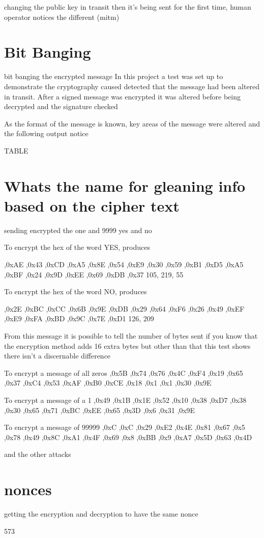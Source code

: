 changing the public key in transit then it's being sent for the first time, human operator notices the different (mitm)

\section{Bit Banging}

bit banging the encrypted message
In this project a test was set up to demonstrate the cryptography caused detected that the message had been altered in transit.
After a signed message was encrypted it was altered before being decrypted and the signature checked

As the format of the message is known, key areas of the message were altered and the following output notice

TABLE


\section{Whats the name for gleaning info based on the cipher text}

sending encrypted the one and 9999
yes and no

To encrypt the hex of the word YES, produces 

,0xAE ,0x43 ,0xCD ,0xA5 ,0x8E ,0x54 ,0xE9 ,0x30
 ,0x59 ,0xB1 ,0xD5 ,0xA5 ,0xBF ,0x24 ,0x9D ,0xEE
 ,0x69 ,0xDB ,0x37
 105, 219, 55

To encrypt the hex of the word NO, produces 

 ,0x2E ,0xBC ,0xCC ,0x6B ,0x9E ,0xDB ,0x29 ,0x64
 ,0xF6 ,0x26 ,0x49 ,0xEF ,0xE9 ,0xFA ,0xBD ,0x9C
 ,0x7E ,0xD1
126, 209

From this message it is possible to tell the number of bytes sent if you know that the encryption method adds 16 extra bytes but other than that this test shows there isn't a discernable difference


To encrypt a message of all zeros
,0x5B ,0x74 ,0x76 ,0x4C ,0xF4 ,0x19 ,0x65 ,0x37
 ,0xC4 ,0x53 ,0xAF ,0xB0 ,0xCE ,0x18 ,0x1 ,0x1
 ,0x30 ,0x9E

To encrypt a message of a 1
,0x49 ,0x1B ,0x1E ,0x52 ,0x10 ,0x38 ,0xD7 ,0x38
 ,0x30 ,0x65 ,0x71 ,0xBC ,0xEE ,0x65 ,0x3D ,0x6
 ,0x31 ,0x9E

To encrypt a message of 99999
,0xC ,0xC ,0x29 ,0xE2 ,0x4E ,0x81 ,0x67 ,0x5
 ,0x78 ,0x49 ,0x8C ,0xA1 ,0x4F ,0x69 ,0x8 ,0xBB
 ,0x9 ,0xA7 ,0x5D ,0x63 ,0x4D

and the other attacks

\section{nonces}

getting the encryption and decryption to have the same nonce


573